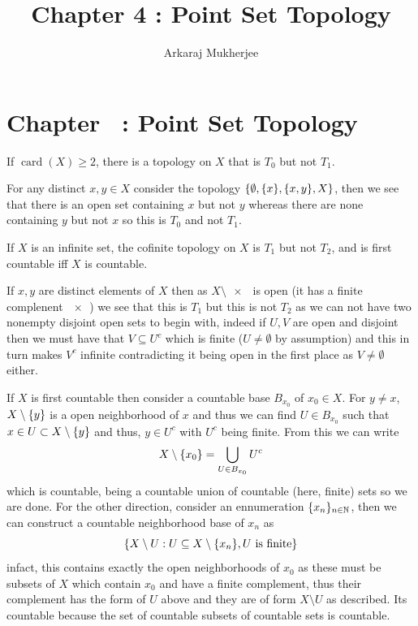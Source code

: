 \documentclass[12pt,a4paper]{article}
\title{\textbf{Chapter 4 : Point Set Topology}}
\author{Arkaraj Mukherjee}
\begin{document}
\maketitle
\newpage
\tableofcontents
\newpage
\setcounter{section}{4}
\section*{Chapter \thesection\ : Point Set Topology}
\begin{problem}\label{prob:4-1}
If $\operatorname{card}(X) \ge 2$, there is a topology on $X$ that is $T_0$ but not $T_1$.
\end{problem}
\begin{solution}
    For any distinct $x,y\in X$ consider the topology $\qty{\emptyset,\qty{x},\qty{x,y},X}$, then we see that there is an open set containing $x$ but not $y$ whereas there are none containing $y$ but not $x$ so this is $T_0$ and not $T_1.$
\end{solution}
\begin{problem}\label{prob:4-2}
If $X$ is an infinite set, the cofinite topology on $X$ is $T_1$ but not $T_2$, and is first countable iff $X$ is countable.
\end{problem}
\begin{solution}
If $x,y$ are distinct elements of $X$ then as $X\setminus \qty{x}$ is open (it has a finite complenent $ \qty{x}$) we see that this is $T_1$ but this is not $T_2$ as we can not have two nonempty disjoint open sets to begin with, indeed if $U,V$ are open and disjoint then we must have that $V\subseteq U^c$ which is finite ($U\neq\emptyset$ by assumption) and this in turn makes $V^c$ infinite contradicting it being open in the first place as $V\neq\emptyset$ either. 

If $X$ is first countable then consider a countable base $B_{x_0}$ of $x_0\in X$. 
For $y\neq x$, $X\setminus \qty{y}$ is a open neighborhood of $x$ and thus we can find $U\in B_{x_0}$ such that $x\in U\subset X\setminus \qty{y}$ and thus, $y\in U^c$ with $U^c$ being finite. 
From this we can write 
\[
    X\setminus \qty{x_0} = \bigcup_{U\in B_{x_0}} U^c
\]
which is countable, being a countable union of countable (here, finite) sets so we are done. 
For the other direction, consider an ennumeration $\{x_n\}_{n\in\mathbb{N}}$, then we can construct a countable neighborhood base of $x_n$ as
\[
    \qty{X\setminus U: U \subseteq X\setminus \qty{x_n},U\text{ is finite}}
\]
infact, this contains exactly the open neighborhoods of $x_0$ as these must be subsets of $X$ which contain $x_0$ and have a finite complement, thus their complement has the form of $U$ above and they are of form $X\setminus U$ as described. 
Its countable because the set of countable subsets of countable sets is countable.  
 \end{solution}
\end{document}
